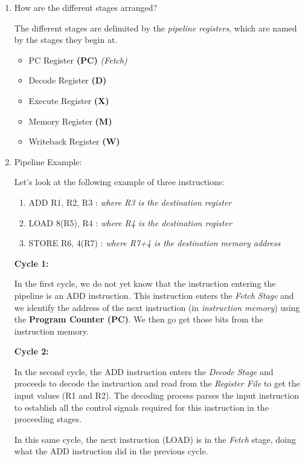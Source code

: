 \documentclass[12pt]{article}
\newenvironment{QandA}{\begin{enumerate}[label=\bfseries\alph*.]\bfseries}
                      {\end{enumerate}}
\newenvironment{answered}{\par\quad\normalfont}{}
\begin{document}
\begin{QandA}
    \item How are the different stages arranged?
    \begin{answered}
    The different stages are delimited by the \textit{pipeline registers}, which are named by the stages they begin at.
    \begin{itemize}
        \item PC Register \textbf{(PC)} \textit{(Fetch)}
        \item Decode Register \textbf{(D)}
        \item Execute Register \textbf{(X)}
        \item Memory Register \textbf{(M)}
        \item Writeback Register \textbf{(W)}
    \end{itemize}
    \end{answered}
    
    \item Pipeline Example:
    \begin{answered}
    Let's look at the following example of three instructions:
    \begin{enumerate}
        \item ADD R1, R2, R3 : \textit{where R3 is the destination register}
        \item LOAD 8(R5), R4 : \textit{where R4 is the destination register}
        \item STORE R6, 4(R7) : \textit{where R7+4 is the destination memory address}
    \end{enumerate}
    
    \textbf{Cycle 1:} 
    
    In the first cycle, we do not yet know that the instruction entering the pipeline is an ADD instruction. This instruction enters the \textit{Fetch Stage} and we identify the address of the next instruction (in \textit{instruction memory}) using the \textbf{Program Counter (PC)}. We then go get those bits from the instruction memory.
    
    \textbf{Cycle 2:} 
    
    In the second cycle, the ADD instruction enters the \textit{Decode Stage} and proceeds to decode the instruction and read from the \textit{Register File} to get the input values (R1 and R2). The decoding process parses the input instruction to establish all the control signals required for this instruction in the proceeding stages.
    
    \quad In this same cycle, the next instruction (LOAD) is in the \textit{Fetch} stage, doing what the ADD instruction did in the previous cycle.
    

\end{answered}
\end{QandA}
\end{document}
